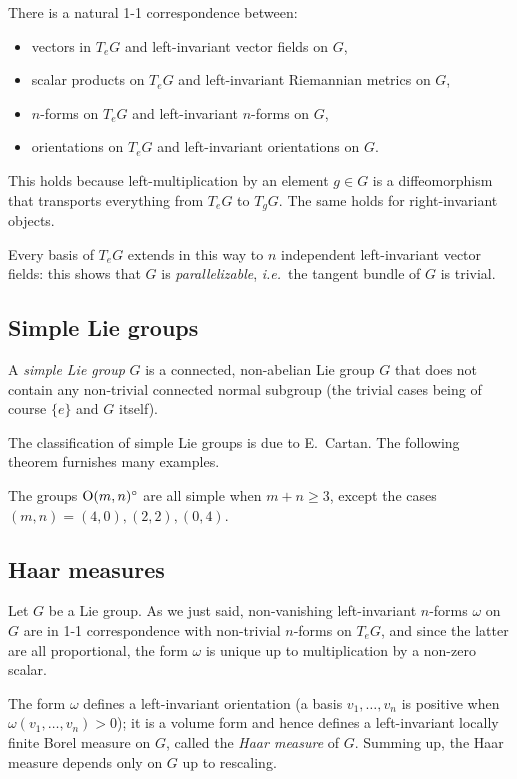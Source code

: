 There is a natural 1-1 correspondence between:
\begin{itemize}
\item vectors in $T_eG$ and left-invariant vector fields on $G$, 
\item scalar products on $T_eG$ and left-invariant Riemannian metrics on $G$,
\item $n$-forms on $T_eG$ and left-invariant $n$-forms on $G$,
\item orientations on $T_eG$ and left-invariant orientations on $G$.
\end{itemize}

This holds because left-multiplication by an element $g\in G$ is a diffeomorphism that transports everything from $T_eG$ to $T_gG$. The same holds for right-invariant objects.

Every basis of $T_eG$ extends in this way to $n$ independent left-invariant vector fields: this shows that $G$ is \emph{parallelizable}, \emph{i.e.}~the tangent bundle of $G$ is trivial.

\subsection{Simple Lie groups} \label{simple:Lie:subsection}
A \emph{simple Lie group} $G$ is a connected, non-abelian Lie group $G$ that does not contain any non-trivial connected normal subgroup (the trivial cases being of course $\{e\}$ and $G$ itself).

The classification of simple Lie groups is due to E.~Cartan. The following theorem furnishes many examples.

\begin{teo}
The groups ${\rm O}(m,n)^\circ$ are all simple when $m+n\geqslant 3$, except the cases $(m,n) = (4,0), (2,2), (0,4)$.
\end{teo}

\subsection{Haar measures} \label{Haar:subsection}
Let $G$ be a Lie group. As we just said, non-vanishing left-invariant $n$-forms $\omega$ on $G$ are in 1-1 correspondence with non-trivial $n$-forms on $T_eG$, and since the latter are all proportional, the form $\omega$ is unique up to multiplication by a non-zero scalar.

The form $\omega$ defines a left-invariant orientation (a basis $v_1,\ldots, v_n$ is positive when $\omega(v_1,\ldots, v_n)>0$); it is a volume form and hence defines a left-invariant locally finite Borel measure on $G$, called the \emph{Haar measure} of $G$. Summing up, the Haar measure depends only on $G$ up to rescaling.

